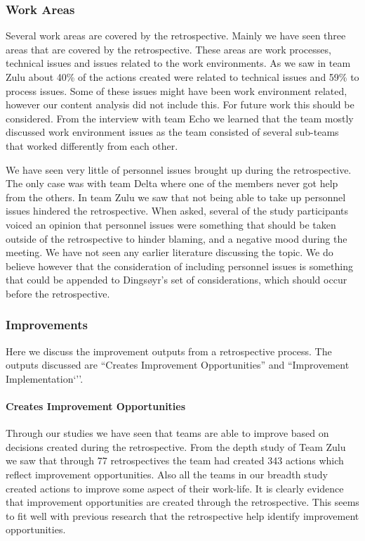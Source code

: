 \subsubsection{Work Areas}

Several work areas are covered by the retrospective. Mainly we have seen three areas that are covered by the retrospective. These areas are work processes, technical issues and issues related to the work environments. As we saw in team Zulu about 40\% of the actions created were related to technical issues and 59\% to process issues. Some of these issues might have been work environment related, however our content analysis did not include this. For future work this should be considered. From the interview with team Echo we learned that the team mostly discussed work environment issues as the team consisted of several sub-teams that worked differently from each other. 

We have seen very little of personnel issues brought up during the retrospective. The only case was with team Delta where one of the members never got help from the others. In team Zulu we saw that not being able to take up personnel issues hindered the retrospective. When asked, several of the study participants voiced an opinion that personnel issues were something that should be taken outside of the retrospective to hinder blaming, and a negative mood during the meeting. We have not seen any earlier literature discussing the topic. We do believe however that the consideration of including personnel issues is something that could be appended to Dingsøyr's \cite{Dingsoyr2004} set of considerations, which should occur before the retrospective.

\subsubsection{Improvements}
Here we discuss the improvement outputs from a retrospective process. The outputs discussed are ``Creates Improvement Opportunities'' and ``Improvement Implementation`''. 

\paragraph{Creates Improvement Opportunities}
Through our studies we have seen that teams are able to improve based on decisions created during the retrospective. From the depth study of Team Zulu we saw that through 77 retrospectives the team had created 343 actions which reflect improvement opportunities. Also all the teams in our breadth study created actions to improve some aspect of their work-life. It is clearly evidence that improvement opportunities are created through the retrospective. This seems to fit well with previous research \cite{Larsen2006, Dingsoyr2004, Drury2012} that the retrospective help identify improvement opportunities. 

